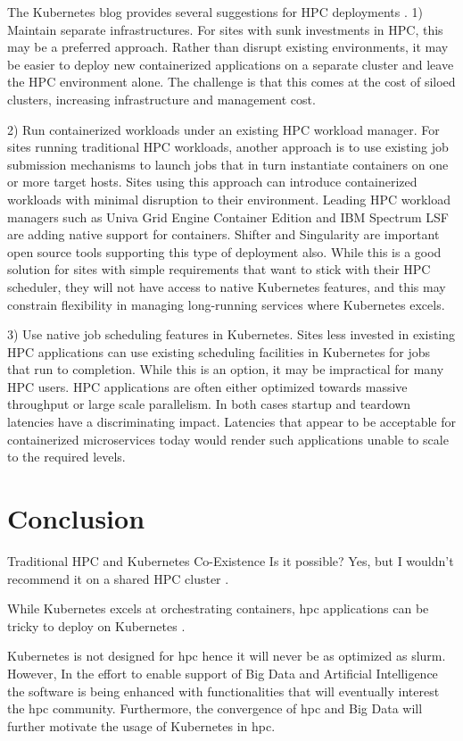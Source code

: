 \documentclass[conference]{IEEEtran}
\begin{document}
The Kubernetes blog provides several suggestions for HPC deployments \cite{kubernetes-blog-hpc}. 1) Maintain separate infrastructures. For sites with sunk investments in HPC, this may be a preferred approach. Rather than disrupt existing environments, it may be easier to deploy new containerized applications on a separate cluster and leave the HPC environment alone. The challenge is that this comes at the cost of siloed clusters, increasing infrastructure and management cost.

2) Run containerized workloads under an existing HPC workload manager. For sites running traditional HPC workloads, another approach is to use existing job submission mechanisms to launch jobs that in turn instantiate containers on one or more target hosts. Sites using this approach can introduce containerized workloads with minimal disruption to their environment. Leading HPC workload managers such as Univa Grid Engine Container Edition and IBM Spectrum LSF are adding native support for containers. Shifter and Singularity are important open source tools supporting this type of deployment also. While this is a good solution for sites with simple requirements that want to stick with their HPC scheduler, they will not have access to native Kubernetes features, and this may constrain flexibility in managing long-running services where Kubernetes excels.

3) Use native job scheduling features in Kubernetes. Sites less invested in existing HPC applications can use existing scheduling facilities in Kubernetes for jobs that run to completion. While this is an option, it may be impractical for many HPC users. HPC applications are often either optimized towards massive throughput or large scale parallelism. In both cases startup and teardown latencies have a discriminating impact. Latencies that appear to be acceptable for containerized microservices today would render such applications unable to scale to the required levels.


\section{Conclusion}
Traditional HPC and Kubernetes Co-Existence Is it possible? Yes, but I wouldn’t recommend it on a shared HPC cluster \cite{cloudy-hutch}.

While Kubernetes excels at orchestrating containers, \gls{hpc} applications can be tricky to deploy on Kubernetes \cite{kubenetes-blog-meets-hpc}.


Kubernetes is not designed for \gls{hpc} hence it will never be as optimized as \gls{slurm}. However, In the effort to enable support of Big Data and Artificial Intelligence the software is being enhanced with functionalities that will eventually interest the \gls{hpc} community. Furthermore, the convergence of \gls{hpc} and Big Data will further motivate the usage of Kubernetes in \gls{hpc}.
\end{document}
